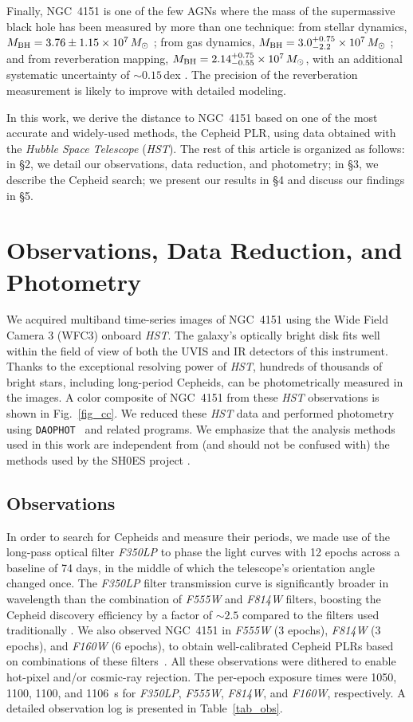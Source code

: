 \documentclass[twocolumn]{aastex63}
\renewcommand{\ng}{NGC\ 4151 }
\newcommand{\hst}{{\it HST} }
\newcommand{\hsts}{{\it HST}}
\newcommand{\hstw}{{\it F350LP} }
\newcommand{\hstv}{{\it F555W} }
\newcommand{\hsti}{{\it F814W} }
\newcommand{\hsth}{{\it F160W} }
\newcommand{\hstws}{{\it F350LP}}
\newcommand{\hstvs}{{\it F555W}}
\newcommand{\hstis}{{\it F814W}}
\newcommand{\hsths}{{\it F160W}}
\begin{document}
Finally, \ng is one of the few AGNs where the mass of the supermassive black hole has been measured by more than one technique: from stellar dynamics, $M_{\rm BH} = 3.76\pm 1.15 \times 10^7\,M_\odot$ \citep{Onken2014}; from gas dynamics, $M_{\rm BH} = 3.0^{+0.75}_{-2.2} \times 10^7\,M_\odot$ \citep{Hicks2008}; and from reverberation mapping, $M_{\rm BH} = 2.14^{+0.75}_{-0.55} \times 10^7\,M_\odot$, with an additional systematic uncertainty of $\sim 0.15$\,dex \citep{DeRosa2018}. The precision of the reverberation measurement is likely to improve with detailed modeling.

In this work, we derive the distance to \ng based on one of the most accurate and widely-used methods, the Cepheid PLR, using data obtained with the {\it Hubble Space Telescope} (\hsts). The rest of this article is organized as follows: in \S2, we detail our observations, data reduction, and photometry; in \S3, we describe the Cepheid search; we present our results in \S4 and discuss our findings in \S5.

\section{Observations, Data Reduction, and Photometry}

We acquired multiband time-series images of \ng using the Wide Field Camera 3 (WFC3) onboard \hsts. The galaxy's optically bright disk  fits well within the field of view of both the UVIS and IR detectors of this instrument. Thanks to the exceptional resolving power of \hsts, hundreds of thousands of bright stars, including long-period Cepheids, can be photometrically measured in the images. A color composite of \ng from these \hst observations is shown in Fig.~\ref{fig_cc}. We reduced these \hst data and performed photometry using {\tt DAOPHOT}~\citep{Stetson1987} and related programs. We emphasize that the analysis methods used in this work are independent from (and should not be confused with) the methods used by the SH0ES project \citep{Hoffmann2016, Riess2016}.

\subsection{Observations}

In order to search for Cepheids and measure their periods, we made use of the long-pass optical filter \hstw to phase the light curves with 12 epochs across a baseline of 74 days, in the middle of which the telescope's orientation angle changed once. The \hstw filter transmission curve is significantly broader in wavelength than the combination of \hstv and \hsti filters, boosting the Cepheid discovery efficiency by a factor of $\sim2.5$ compared to the filters used traditionally \citep{Hoffmann2016}. We also observed \ng in \hstv (3 epochs), \hsti (3 epochs), and \hsth (6 epochs), to obtain well-calibrated Cepheid PLRs based on combinations of these filters~\citep{Riess2016}. All these observations were dithered to enable hot-pixel and/or cosmic-ray rejection. The  per-epoch exposure times were 1050, 1100, 1100, and 1106~s for \hstws, \hstvs, \hstis, and \hsths, respectively. A detailed observation log is presented in Table~\ref{tab_obs}.
\end{document}

